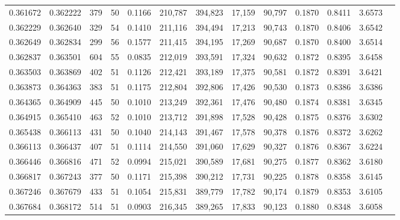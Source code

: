 \begin{tabular}{rrrrrrrrrrrrr}
0.361672 & 0.362222 &   379 &  50 &                                     0.1166 & 210,787 & 394,823 &  17,159 &  90,797 & 0.1870 & 0.8411 & 3.6573 \\
0.362229 & 0.362640 &   329 &  54 &                                     0.1410 & 211,116 & 394,494 &  17,213 &  90,743 & 0.1870 & 0.8406 & 3.6542 \\
0.362649 & 0.362834 &   299 &  56 &                                     0.1577 & 211,415 & 394,195 &  17,269 &  90,687 & 0.1870 & 0.8400 & 3.6514 \\
0.362837 & 0.363501 &   604 &  55 &                                     0.0835 & 212,019 & 393,591 &  17,324 &  90,632 & 0.1872 & 0.8395 & 3.6458 \\
0.363503 & 0.363869 &   402 &  51 &                                     0.1126 & 212,421 & 393,189 &  17,375 &  90,581 & 0.1872 & 0.8391 & 3.6421 \\
0.363873 & 0.364363 &   383 &  51 &                                     0.1175 & 212,804 & 392,806 &  17,426 &  90,530 & 0.1873 & 0.8386 & 3.6386 \\
0.364365 & 0.364909 &   445 &  50 &                                     0.1010 & 213,249 & 392,361 &  17,476 &  90,480 & 0.1874 & 0.8381 & 3.6345 \\
0.364915 & 0.365410 &   463 &  52 &                                     0.1010 & 213,712 & 391,898 &  17,528 &  90,428 & 0.1875 & 0.8376 & 3.6302 \\
0.365438 & 0.366113 &   431 &  50 &                                     0.1040 & 214,143 & 391,467 &  17,578 &  90,378 & 0.1876 & 0.8372 & 3.6262 \\
0.366113 & 0.366437 &   407 &  51 &                                     0.1114 & 214,550 & 391,060 &  17,629 &  90,327 & 0.1876 & 0.8367 & 3.6224 \\
0.366446 & 0.366816 &   471 &  52 &                                     0.0994 & 215,021 & 390,589 &  17,681 &  90,275 & 0.1877 & 0.8362 & 3.6180 \\
0.366817 & 0.367243 &   377 &  50 &                                     0.1171 & 215,398 & 390,212 &  17,731 &  90,225 & 0.1878 & 0.8358 & 3.6145 \\
0.367246 & 0.367679 &   433 &  51 &                                     0.1054 & 215,831 & 389,779 &  17,782 &  90,174 & 0.1879 & 0.8353 & 3.6105 \\
0.367684 & 0.368172 &   514 &  51 &                                     0.0903 & 216,345 & 389,265 &  17,833 &  90,123 & 0.1880 & 0.8348 & 3.6058 \\

\end{tabular}
